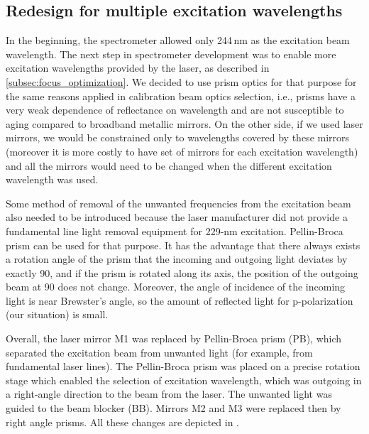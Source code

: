 \subsection{Redesign for multiple excitation wavelengths}

In the beginning, the spectrometer allowed only 244\,nm as the excitation beam
wavelength.
The next step in spectrometer development was to enable more excitation
wavelengths provided by the laser, as described in
\cref{subsec:focus_optimization}.
We decided to use prism optics for that purpose for the same reasons applied in
calibration beam optics selection, i.e., prisms have a very weak
dependence of reflectance on wavelength and are not susceptible to aging
compared to broadband metallic mirrors.
On the other side, if we used laser mirrors, we would be constrained only to
wavelengths covered by these mirrors (moreover it is more costly to have set of
mirrors for each excitation wavelength) and all the mirrors would need to be
changed when the different excitation wavelength was used.

Some method of removal of the unwanted frequencies from the excitation beam
also needed to be introduced because the laser manufacturer did not provide a
fundamental line light removal equipment for 229-nm excitation.
Pellin-Broca prism can be used for that purpose.
It has the advantage that there always exists a rotation angle of the prism
that the incoming and outgoing light deviates by exactly 90\textdegree{}, and
if the prism is rotated along its axis, the position of the outgoing beam at
90\textdegree{} does not change.
Moreover, the angle of incidence of the incoming light is near Brewster's
angle, so the amount of reflected light for p-polarization (our situation) is
small.

Overall, the laser mirror M1 was replaced by Pellin-Broca prism (PB), which
separated the excitation beam from unwanted light (for example, from
fundamental laser lines).
The Pellin-Broca prism was placed on a precise rotation stage which enabled the
selection of excitation wavelength, which was outgoing in a right-angle
direction to the beam from the laser.
The unwanted light was guided to the beam blocker (BB).
Mirrors M2 and M3 were replaced then by right angle prisms.
All these changes are depicted in
.

